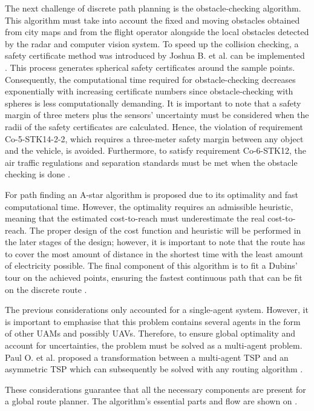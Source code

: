 The next challenge of discrete path planning is the obstacle-checking algorithm.
This algorithm must take into account the fixed and moving obstacles obtained from city maps and from the flight operator alongside the local obstacles detected by the radar and computer vision system.
To speed up the collision checking, a safety certificate method was introduced by Joshua B. et al.
can be implemented \cite{safety_certificates}.
This process generates spherical safety certificates around the sample points.
Consequently, the computational time required for obstacle-checking decreases exponentially with increasing certificate numbers since obstacle-checking with spheres is less computationally demanding.
It is important to note that a safety margin of three meters plus the sensors’ uncertainty must be considered when the radii of the safety certificates are calculated.
Hence, the violation of requirement Co-5-STK14-2-2, which requires a three-meter safety margin between any object and the vehicle, is avoided.
Furthermore, to satisfy requirement Co-6-STK12, the air traffic regulations and separation standards must be met when the obstacle checking is done \cite{multy_agent_ATC1}.

For path finding an A-star algorithm is proposed due to its optimality and fast computational time.
However, the optimality requires an admissible heuristic, meaning that the estimated cost-to-reach must underestimate the real cost-to-reach.
The proper design of the cost function and heuristic will be performed in the later stages of the design; however, it is important to note that the route has to cover the most amount of distance in the shortest time with the least amount of electricity possible.
The final component of this algorithm is to fit a Dubins’ tour on the achieved points, ensuring the fastest continuous path that can be fit on the discrete route \cite{dubins}.

The previous considerations only accounted for a single-agent system.
However,
it is important to emphasise that this problem contains several agents in the form of other UAMs and possibly UAVs.
Therefore, to ensure global optimality and account for uncertainties,
the problem must be solved as a multi-agent problem.
Paul O. et al.
proposed a transformation between a multi-agent TSP  and an asymmetric TSP which can subsequently be solved with any routing algorithm \cite{todays_traveling_salesman}.

These considerations guarantee that all the necessary components are present for a global route planner.
The algorithm’s essential parts and flow are shown on .

